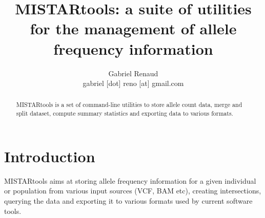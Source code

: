 \documentclass[a4paper]{article}
\title{MISTARtools: a suite of utilities for the management of allele frequency information}
\author{Gabriel Renaud \\
gabriel [dot] reno [at]  gmail.com}
\date{}
\begin{document}
\maketitle

\begin{abstract}
MISTARtools is a set of command-line utilities to store allele count data, merge and split dataset, compute summary statistics and exporting data to various formats.
\end{abstract}

\tableofcontents

\section{Introduction}

MISTARtools aims at storing allele frequency information for a given individual or population from various input sources (VCF, BAM etc), creating intersections, querying the data and exporting it to various formats used by current software tools.
\end{document}
